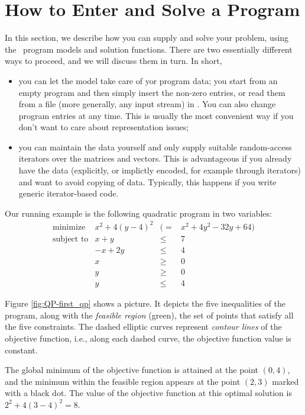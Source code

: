 \section{How to Enter and Solve a Program\label{sec:QP-first}}
In this section, we describe how you can supply and solve your problem, 
using the \cgal\ program models and solution functions. 
There are two essentially different ways to proceed, 
and we will discuss them in turn. In short, 
\begin{itemize}
\item you can let the model take care of yor program data; you start 
from an empty program and then simply insert the non-zero entries, or
read them from a file (more generally, any input stream) in 
. You can also change program entries at any time. 
This is usually the most convenient way if you don't want to care
about representation issues;
\item you can maintain the data yourself and only supply suitable 
random-access iterators over the matrices and vectors. This is 
advantageous if you already have the data (explicitly, or implictly
encoded, for example through iterators) and want to avoid copying 
of data. Typically, this happens if you write generic iterator-based 
code. 
\end{itemize}
 
Our running example is the following quadratic program in two variables:
\[
\begin{array}{lrcl}
\mbox{minimize}       & x^2 + 4(y-4)^2 &(=& x^2 + 4y^2 - 32y + 64) \\
\mbox{subject to}     & x + y &\leq& 7 \\
                      & -x + 2y &\leq& 4 \\
                      & x &\geq& 0 \\
                      & y &\geq& 0 \\
                      & y &\leq& 4
\end{array}
\]

Figure \ref{fig:QP-first_qp} shows a picture. It
depicts the five inequalities of the program, along with the
\emph{feasible region} (green), the set of points that satisfy all the
five constraints. The dashed elliptic curves represent \emph{contour lines} 
of the objective function, i.e., along each dashed curve, the objective
function value is constant. 

The global minimum of the objective function is attained at 
the point $(0,4)$, and the minimum within the feasible region appears
at the point $(2,3)$ marked with a black dot. The value of the objective
function at this optimal solution is $2^2 + 4(3-4)^2 = 8$.

